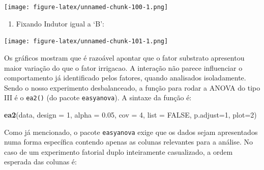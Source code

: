 \documentclass[
]{article}
\newenvironment{Shaded}{\begin{snugshade}}{\end{snugshade}}
\newcommand{\DataTypeTok}[1]{\textcolor[rgb]{0.13,0.29,0.53}{#1}}
\newcommand{\DecValTok}[1]{\textcolor[rgb]{0.00,0.00,0.81}{#1}}
\newcommand{\FloatTok}[1]{\textcolor[rgb]{0.00,0.00,0.81}{#1}}
\newcommand{\KeywordTok}[1]{\textcolor[rgb]{0.13,0.29,0.53}{\textbf{#1}}}
\newcommand{\NormalTok}[1]{#1}
\newcommand{\OperatorTok}[1]{\textcolor[rgb]{0.81,0.36,0.00}{\textbf{#1}}}
\newcommand{\OtherTok}[1]{\textcolor[rgb]{0.56,0.35,0.01}{#1}}
\newcommand{\StringTok}[1]{\textcolor[rgb]{0.31,0.60,0.02}{#1}}
\providecommand{\tightlist}{%
  \setlength{\itemsep}{0pt}\setlength{\parskip}{0pt}}
\begin{document}
\begin{Shaded}
\end{Shaded}

\texttt{[image: figure-latex/unnamed-chunk-100-1.png]}

\begin{enumerate}
\def\labelenumi{\arabic{enumi}.}
\setcounter{enumi}{6}
\tightlist
\item
  Fixando Indutor igual a `B':
\end{enumerate}

\begin{Shaded}
\end{Shaded}

\texttt{[image: figure-latex/unnamed-chunk-101-1.png]}

Os gráficos mostram que é razoável apontar que o fator substrato apresentou maior variação do que o fator irrigacao. A interação não parece influenciar o comportamento já identificado pelos fatores, quando analisados isoladamente. Sendo o nosso experimento desbalanceado, a função para rodar a ANOVA do tipo III é o \texttt{ea2()} (do pacote \texttt{easyanova}). A sintaxe da função é:

\begin{Shaded}
\begin{Highlighting}[]
\KeywordTok{ea2}\NormalTok{(data, }\DataTypeTok{design =} \DecValTok{1}\NormalTok{, }\DataTypeTok{alpha =} \FloatTok{0.05}\NormalTok{, }\DataTypeTok{cov =} \DecValTok{4}\NormalTok{, }\DataTypeTok{list =} \OtherTok{FALSE}\NormalTok{, }\DataTypeTok{p.adjust=}\DecValTok{1}\NormalTok{, }\DataTypeTok{plot=}\DecValTok{2}\NormalTok{)}
\end{Highlighting}
\end{Shaded}

Como já mencionado, o pacote \texttt{easyanova} exige que os dados sejam apresentados numa forma específica contendo apenas as colunas relevantes para a análise. No caso de um experimento fatorial duplo inteiramente casualizado, a ordem esperada das colunas é:
\end{document}
